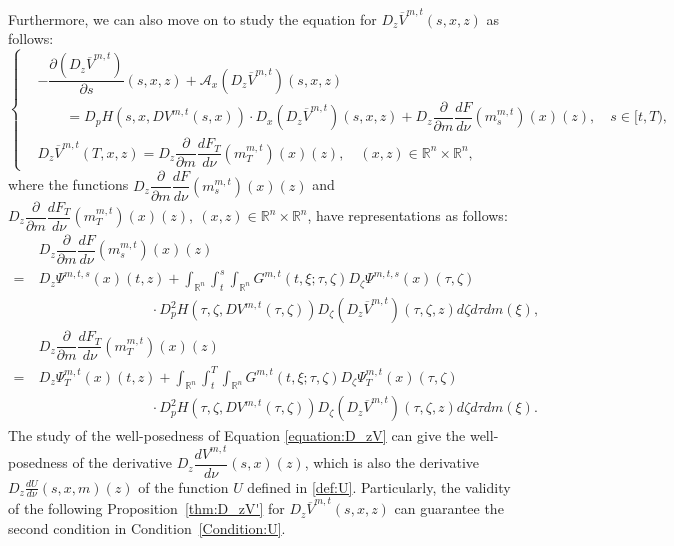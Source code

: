 \documentclass[11pt]{article}
\numberwithin{equation}{section}
\newcommand{\brn}{{\mathbb{R}^n}}
\newcommand{\1}{\mbox{1\hspace{-1mm}I}}
\begin{document}
Furthermore, we can also move on to study the equation for $D_z\overline{V}^{m,t}(s,x,z)$ as follows:
\begin{equation}\label{equation:D_zV}
    \left\{
    \begin{aligned}
        &-\dfrac{\partial \left(D_z\overline{V}^{m,t}\right)}{\partial s}(s,x,z)+\mathcal{A}_{x}\left(D_z\overline{V}^{m,t}\right)(s,x,z)\\
        &\qquad =D_{p}H\left(s,x,DV^{m,t}(s,x)\right)\cdot D_{x}\left(D_z\overline{V}^{m,t}\right)(s,x,z)+D_z\dfrac{\partial}{\partial m}\dfrac{dF}{d\nu}\left(m^{m,t}_s\right)(x)(z),\quad s\in[t,T),\\
        &D_z\overline{V}^{m,t}(T,x,z)=D_z\dfrac{\partial}{\partial m}\dfrac{dF_{T}}{d\nu}\left(m^{m,t}_T\right)(x)(z),\quad (x,z)\in\brn\times\brn,
    \end{aligned}
    \right.
\end{equation}
where the functions $D_z\dfrac{\partial}{\partial m}\dfrac{dF}{d\nu}\left(m^{m,t}_s\right)(x)(z)$ and $D_z\dfrac{\partial}{\partial m}\dfrac{dF_{T}}{d\nu}\left(m^{m,t}_T\right)(x)(z),\  (x,z)\in\brn\times\brn$, have representations 
as follows: 
\begin{align*}
    &D_z\dfrac{\partial}{\partial m}\dfrac{dF}{d\nu}\left(m^{m,t}_s\right)(x)(z)\\
    =\ & D_z\Psi^{m,t,s}(x)(t,z)+\int_{\brn}\int_{t}^{s}\int_{\brn}G^{m,t}(t,\xi;\tau,\zeta) D_{\zeta}\Psi^{m,t,s}(x)(\tau,\zeta)\\
    &\qquad\qquad\qquad\qquad \cdot D_{p}^{2}H\left(\tau,\zeta,DV^{m,t}(\tau,\zeta)\right)D_{\zeta}\left(D_z\overline{V}^{m,t}\right)(\tau,\zeta,z) d\zeta d\tau dm(\xi),\\
    &D_z\dfrac{\partial}{\partial m}\dfrac{dF_T}{d\nu}\left(m^{m,t}_T\right)(x)(z)\\
    =\ & D_z\Psi^{m,t}_T(x)(t,z)+\int_{\brn}\int_{t}^{T}\int_{\brn}G^{m,t}(t,\xi;\tau,\zeta) D_{\zeta}\Psi^{m,t}_T(x)(\tau,\zeta)\\
    &\qquad\qquad\qquad\qquad \cdot D_{p}^{2}H\left(\tau,\zeta,DV^{m,t}(\tau,\zeta)\right)D_{\zeta}\left(D_z\overline{V}^{m,t}\right)(\tau,\zeta,z) d\zeta d\tau dm(\xi).
\end{align*}
The study of the well-posedness of Equation \eqref{equation:D_zV} can give the well-posedness of the derivative $D_z\dfrac{dV^{m,t}}{d\nu}(s,x)(z)$, which is also the derivative $D_z\frac{dU}{d\nu}(s,x,m)(z)$ of the function $U$ defined in \eqref{def:U}. Particularly, the validity of the following Proposition~\ref{thm:D_zV'} for $D_z\overline{V}^{m,t}(s,x,z)$ can guarantee the second condition in Condition~\ref{Condition:U}. 
\end{document}
